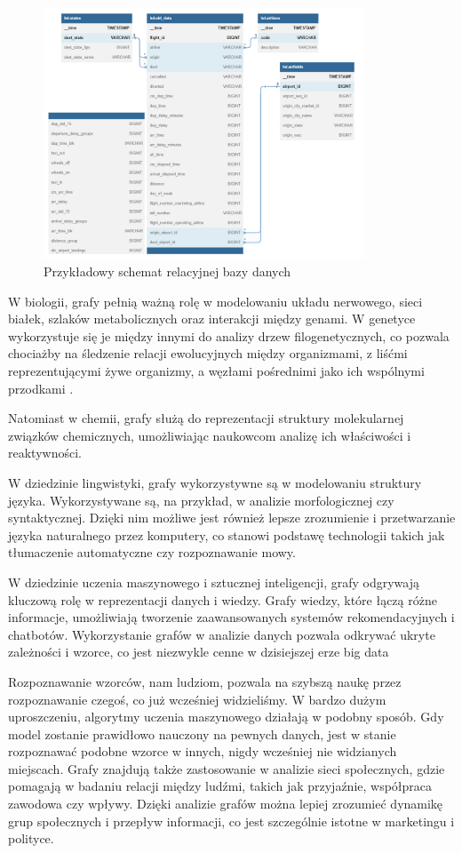 \begin{figure}[ht]
	\centering
	\includegraphics[height=7.5cm]{partials/images/intro_database.png}
	\caption{Przykładowy schemat relacyjnej bazy danych}
    \label{Fig:intro-2}
\end{figure}

W biologii, grafy pełnią ważną rolę w modelowaniu układu nerwowego, sieci białek,
szlaków metabolicznych oraz interakcji między genami.
W genetyce wykorzystuje się je między innymi do analizy drzew filogenetycznych,
co pozwala chociażby na śledzenie relacji ewolucyjnych między organizmami,
z liśćmi reprezentującymi żywe organizmy, a węzłami pośrednimi jako ich wspólnymi przodkami \cite{Erciyes2023}.

Natomiast w chemii, grafy służą do reprezentacji struktury molekularnej związków chemicznych,
umożliwiając naukowcom analizę ich właściwości i reaktywności.

W dziedzinie lingwistyki, grafy wykorzystywne są w modelowaniu struktury języka.
Wykorzystywane są, na przykład, w analizie morfologicznej czy syntaktycznej.
Dzięki nim możliwe jest również lepsze zrozumienie i przetwarzanie języka naturalnego przez komputery,
co stanowi podstawę technologii takich jak tłumaczenie automatyczne czy rozpoznawanie mowy.

W dziedzinie uczenia maszynowego i sztucznej inteligencji, grafy odgrywają kluczową rolę w reprezentacji danych i wiedzy.
Grafy wiedzy, które łączą różne informacje, umożliwiają tworzenie zaawansowanych systemów rekomendacyjnych i chatbotów.
Wykorzystanie grafów w analizie danych pozwala odkrywać ukryte zależności i wzorce, co jest niezwykle cenne w dzisiejszej erze big data

Rozpoznawanie wzorców, nam ludziom, pozwala na szybszą naukę przez rozpoznawanie czegoś, co już wcześniej widzieliśmy.
W bardzo dużym uproszczeniu, algorytmy uczenia maszynowego działają w podobny sposób.
Gdy model zostanie prawidłowo nauczony na pewnych danych, jest w stanie rozpoznawać podobne wzorce w innych,
nigdy wcześniej nie widzianych miejscach.
Grafy znajdują także zastosowanie w analizie sieci społecznych, gdzie pomagają w badaniu relacji między ludźmi,
takich jak przyjaźnie, współpraca zawodowa czy wpływy.
Dzięki analizie grafów można lepiej zrozumieć dynamikę grup społecznych i przepływ informacji,
co jest szczególnie istotne w marketingu i polityce.

